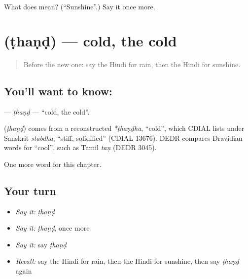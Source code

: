 \begin{tcolorbox}[breakable,colback=teal!4,colframe=teal!35!black,title={Before you move on}]
What does  mean? (\textquotedblleft{}Sunshine\textquotedblright{}.) Say it once more.
\end{tcolorbox}
\section[\texorpdfstring{\hi{ठंड} (ṭhaṇḍ)}{ठंड (ṭhaṇḍ)}]{ (ṭhaṇḍ) — cold, the cold}

\label{lesson:HI-C185-thand}



\begin{quote}
Before the new one: say the Hindi for rain, then the Hindi for sunshine.
\end{quote}

\subsection*{You'll want to know: }
\textbf{} — \emph{ṭhaṇḍ} — \textquotedblleft{}cold, the cold\textquotedblright{}.

\begin{cousinweb}
\textbf{} (\emph{ṭhaṇḍ}) comes from a reconstructed \emph{*ṭhaṇḍha}, \textquotedblleft{}cold\textquotedblright{}, which CDIAL lists under Sanskrit \emph{stabdha}, \textquotedblleft{}stiff, solidified\textquotedblright{} (CDIAL 13676). DEDR compares Dravidian words for \textquotedblleft{}cool\textquotedblright{}, such as Tamil \emph{taṇ} (DEDR 3045).
\end{cousinweb}

\begin{grammarlens}[title={What you've built}]
One more word for this chapter.
\end{grammarlens}

\subsection*{Your turn}
\begin{itemize}
\raggedright
  \item \emph{Say it:} \emph{ṭhaṇḍ}
  \item \emph{Say it:} \emph{ṭhaṇḍ}, once more
  \item \emph{Say it:} say \emph{ṭhaṇḍ}
  \item \emph{Recall:} say the Hindi for rain, then the Hindi for sunshine, then say \emph{ṭhaṇḍ} again
\end{itemize}

